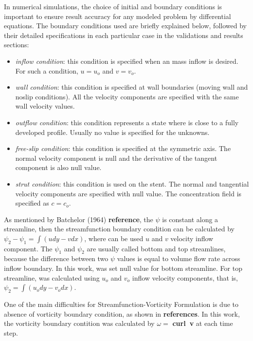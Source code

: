 In numerical simulations, the choice of initial and boundary conditions
is important to ensure result accuracy for any modeled problem 
by differential equations. 
The boundary conditions used
are briefly explained below, 
followed by their detailed specifications 
in each particular case in the validations and results sections:

\begin{itemize}
 \item \textit{inflow condition}:
 this condition is specified when an mass inflow is desired.
 For such a condition, $u = u_{o}$
 and $v = v_{o}$.

 \item \textit{wall condition}:
 this condition is specified at wall boundaries (moving wall
 and noslip conditions).
 All the velocity components are specified with 
 the same wall velocity values.

 \item \textit{outflow condition}: 
 this condition represents a state where is close to a
 fully developed profile.
 Usually no value is specified for the unknowns.

 \item \textit{free-slip condition}: 
 this condition is specified at the symmetric axis.
 The normal velocity component is null and the derivative of
 the tangent component is also null value.

 \item \textit{strut condition}: 
 this condition is used on the stent. The normal and tangential
 velocity components are specified with null value. 
 The concentration field is specified as $c=c_{o}$.
\end{itemize}

As mentioned by Batchelor (1964) \textbf{reference},
the $\psi$ is constant along a streamline, then
the streamfunction boundary condition can be calculated by
$\psi_{2} - \psi_{1} = \int \left(udy - vdx\right)$,
where can be used $u$ and $v$ velocity inflow component.
The $\psi_{1}$ and $\psi_{2}$ are usually called 
bottom and top streamlines, because the difference
between two $\psi$ values is equal to volume flow
rate across inflow boundary. In this work, was set
null value for bottom streamline. For top streamline,
was calculated using $u_{o}$ and $v_{o}$ inflow velocity
components, that is, $\psi_{2} = \int \left(u_{o}dy - v_{o}dx\right)$.

\medskip
One of the main difficulties for
Streamfunction-Vorticity Formulation is due to absence of vorticity
boundary condition, as shown in \textbf{references}.
In this work, the vorticity boundary contition
was calculated by $\omega =$ \textbf{curl\ v}
at each time step.
